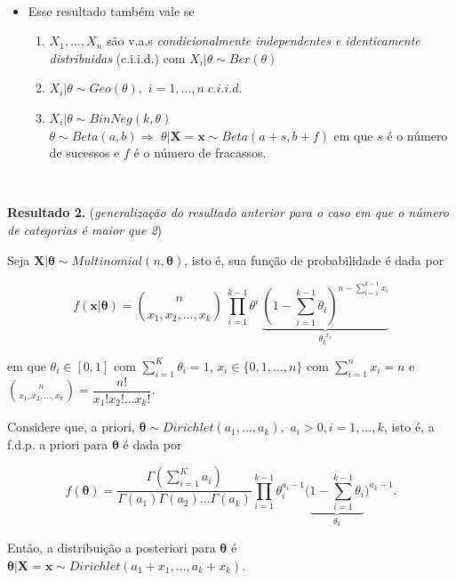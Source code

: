 \documentclass[
]{book}
\providecommand{\tightlist}{%
  \setlength{\itemsep}{0pt}\setlength{\parskip}{0pt}}
\begin{document}
\(~\)

\begin{itemize}
\tightlist
\item
  Esse resultado também vale se

  \begin{enumerate}
  \def\labelenumi{\arabic{enumi}.}
  \tightlist
  \item
    \(X_1,\ldots,X_n\) são v.a.s \emph{condicionalmente independentes e identicamente distribuidas} (c.i.i.d.) com \(X_i|\theta \sim Ber(\theta)\)\\
  \item
    \(X_i|\theta\sim Geo(\theta),\) \(i=1,\ldots,n \; c.i.i.d.\)\\
  \item
    \(X_i|\theta \sim BinNeg(k,\theta)\)\\
    \(\theta\sim Beta(a,b)\Rightarrow\) \(\theta|\boldsymbol X=\boldsymbol x \sim Beta(a+s,b+f)\) em que \(s\) é o número de sucessos e \(f\) é o número de fracassos.
  \end{enumerate}
\end{itemize}

\(~\)

\textbf{Resultado 2.} (\emph{generalização do resultado anterior para o caso em que o número de categorias é maior que 2})

Seja \(\boldsymbol X | \boldsymbol \theta \sim Multinomial(n,\boldsymbol \theta)\), isto é, sua função de probabilidade é dada por

\[f(\boldsymbol x| \boldsymbol \theta)= \binom{n}{x_1,x_2,\ldots,x_k}~\prod_{i=1}^{k-1}\theta^i~\underbrace{\left(1-\sum_{i=1}^{k-1}\theta_i\right)^{\displaystyle n-\sum_{i=1}^{k-1}x_i}}_{\displaystyle \theta_k^{~~x_k}}\]

em que \(\theta_i\in [0,1]\) com \(\sum_{i=1}^K\theta_i=1\), \(x_i \in \{0,1,\ldots,n\}\) com \(\sum_{i=1}^nx_i=n\) e \(\displaystyle \binom{n}{x_1,x_2,\ldots,x_k}=\dfrac{n!}{x_1!x_2!\ldots x_k!}\).

Considere que, a priori, \(\boldsymbol \theta \sim Dirichlet(a_1,\ldots,a_k),\) \(a_i > 0, i=1,\ldots,k\), isto é, a f.d.p. a priori para \(\boldsymbol \theta\) é dada por

\[f(\boldsymbol \theta) = \dfrac{\Gamma(\sum_{i=1}^K a_i)}{\Gamma(a_1)\Gamma(a_2)\ldots\Gamma(a_k)}\prod_{i=1}^{k-1}\theta_i^{a_i-1}\bigg(\underbrace{1-\sum_{i=1}^{k-1}\theta_i}_{\theta_k}\bigg)^{a_k-1}.\]

Então, a distribuição a posteriori para \(\boldsymbol \theta\) é
\(\boldsymbol \theta|\boldsymbol X = \boldsymbol x \sim Dirichlet (a_1+x_1,\ldots,a_k+x_k)\).
\end{document}
